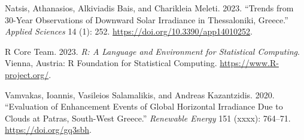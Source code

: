 \documentclass[
]{article}
\newlength{\cslhangindent}
\newlength{\cslentryspacingunit} %
\newenvironment{CSLReferences}[2] %
 {%
  \setlength{\parindent}{0pt}
  \ifodd #1
  \let\oldpar\par
  \def\par{\hangindent=\cslhangindent\oldpar}
  \fi
  \setlength{\parskip}{#2\cslentryspacingunit}
 }%
 {}
\begin{document}
\begin{CSLReferences}{1}{0}
\leavevmode{}%
Natsis, Athanasios, Alkiviadis Bais, and Charikleia Meleti. 2023. {``Trends from 30-Year Observations of Downward Solar Irradiance in Thessaloniki, Greece.''} \emph{Applied Sciences} 14 (1): 252. \url{https://doi.org/10.3390/app14010252}.

\leavevmode{}%
R Core Team. 2023. \emph{R: A Language and Environment for Statistical Computing}. Vienna, Austria: R Foundation for Statistical Computing. \url{https://www.R-project.org/}.

\leavevmode{}%
Vamvakas, Ioannis, Vasileios Salamalikis, and Andreas Kazantzidis. 2020. {``Evaluation of Enhancement Events of Global Horizontal Irradiance Due to Clouds at Patras, South-West Greece.''} \emph{Renewable Energy} 151 (xxxx): 764--71. \url{https://doi.org/gq3sbh}.

\end{CSLReferences}
\end{document}
